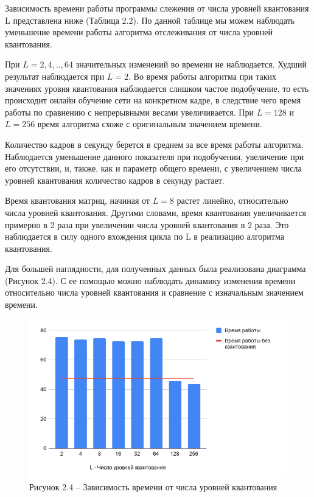 Зависимость времени работы программы слежения от числа уровней квантования L представлена ниже (Таблица 2.2). По данной таблице мы можем наблюдать уменьшение времени работы алгоритма отслеживания от числа уровней квантования. 



При $L = 2,4,..,64$ значительных изменений во времени не наблюдается. Худший результат наблюдается при $L=2$. Во время работы алгоритма при таких значениях уровня квантования наблюдается слишком частое подобучение, то есть происходит онлайн обучение сети на конкретном кадре, в следствие чего время работы по сравнению с непрерывными весами увеличивается. При $L = 128$ и $L = 256$ время алгоритма схоже с оригинальным значением времени.

Количество кадров в секунду берется в среднем за все время работы алгоритма. Наблюдается уменьшение данного показателя при подобучении, увеличение при его отсутствии, и, также, как и параметр общего времени, с увеличением числа уровней квантования количество кадров в секунду растает.

Время квантования матриц, начиная от $L=8$ растет линейно, относительно числа уровней квантования. Другими словами, время квантования увеличивается примерно в 2 раза при увеличении числа уровней квантования в 2 раза. Это наблюдается в силу одного вхождения цикла по L в реализацию алгоритма квантования. 

Для большей наглядности, для полученных данных была реализована диаграмма (Рисунок 2.4). С ее помощью можно наблюдать динамику изменения времени относительно числа уровней квантования и сравнение с изначальным значением времени. 

\begin{figure}[h!]
    \centering
    \includegraphics[width = 14 cm]{tests/img/time.png}
    \caption*{Рисунок 2.4 -- Зависимость времени от числа уровней квантования }
    \label{fig:my_label}
\end{figure}


